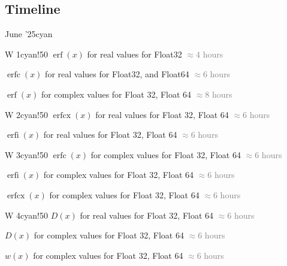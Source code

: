 \documentclass{article}
\newcommand{\release}[2]{%
        #1
        \hspace*{\fill}
        \textcolor{gray}{#2}\par}
\theoremstyle{mytheoremstyle}
\theoremstyle{mytheoremstyle}
\theoremstyle{myproblemstyle}
\begin{document}
    \subsection*{Timeline}
      \begin{releaseyear}{June '25}{cyan}
        \begin{releasequarter}{W 1}{cyan!50}
          \release{$\operatorname{erf}(x)$ for real values for Float32 }{$\approx 4$  hours}
          \release{$\operatorname{erfc}(x)$ for real values for Float32, and Float64}{$\approx 6$  hours}
          \release{$\operatorname{erf}(x)$ for complex values for Float 32, Float 64}{$\approx 8$  hours}
        \end{releasequarter}
        \begin{releasequarter}{W 2}{cyan!50}
          \release{$\operatorname{erfcx}(x)$ for real values for Float 32, Float 64}{$\approx 6$  hours}
          \release{$\operatorname{erfi}(x)$ for real values for Float 32, Float 64}{$\approx 6$  hours}

        \end{releasequarter}
        \begin{releasequarter}{W 3}{cyan!50}
          \release{$\operatorname{erfc}(x)$ for complex values for Float 32, Float 64}{$\approx 6$  hours}
          \release{$\operatorname{erfi}(x)$ for complex values for Float 32, Float 64}{$\approx 6$  hours}
          \release{$\operatorname{erfcx }(x)$ for complex values for Float 32, Float 64}{$\approx 6$  hours}
        \end{releasequarter}
        \begin{releasequarter}{W 4}{cyan!50}
          \release{$D(x)$ for real values for Float 32, Float 64}{$\approx 6$  hours}
          \release{$D(x)$ for complex values for Float 32, Float 64}{$\approx 6$  hours}
          \release{$w(x)$ for complex values for Float 32, Float 64}{$\approx 6$  hours}
        \end{releasequarter}
      \end{releaseyear}
\end{document}

